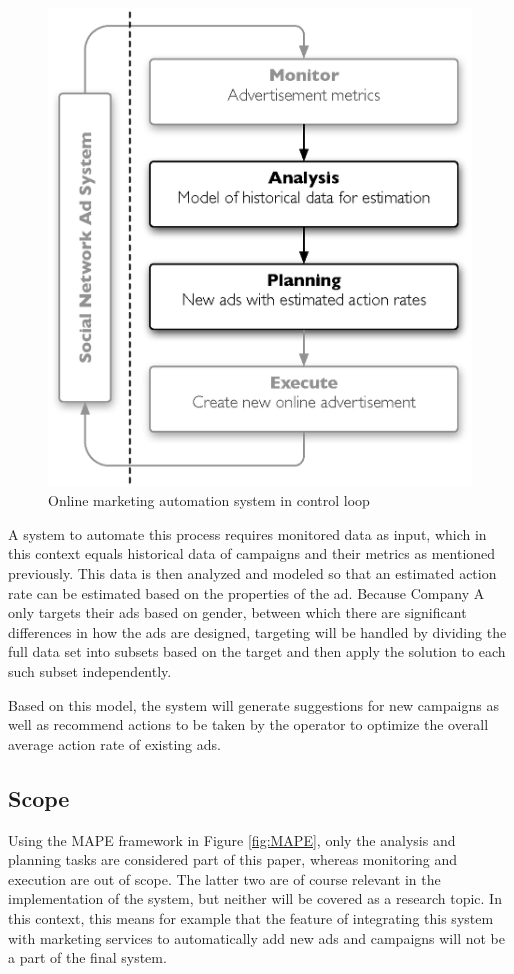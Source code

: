 \documentclass{sig-alternate}
\begin{document}
\begin{figure}[htb] \centering \includegraphics[width=0.96\columnwidth]{mape-marketing.eps}
	\caption{Online marketing automation system in control loop}
	\label{fig:MAPEMarketing}
\end{figure}

A system to automate this process requires monitored data as input, which in this context equals historical data of campaigns and their metrics as mentioned previously. This data is then analyzed and modeled so that an estimated action rate can be estimated based on the properties of the ad. Because Company A only targets their ads based on gender, between which there are significant differences in how the ads are designed, targeting will be handled by dividing the full data set into subsets based on the target and then apply the solution to each such subset independently.

Based on this model, the system will generate suggestions for new campaigns as well as recommend actions to be taken by the operator to optimize the overall average action rate of existing ads.

\subsection{Scope}
Using the MAPE framework in Figure \ref{fig:MAPE}, only the analysis and planning tasks are considered part of this paper, whereas monitoring and execution are out of scope. The latter two are of course relevant in the implementation of the system, but neither will be covered as a research topic. In this context, this means for example that the feature of integrating this system with marketing services to automatically add new ads and campaigns will not be a part of the final system.
\end{document}
